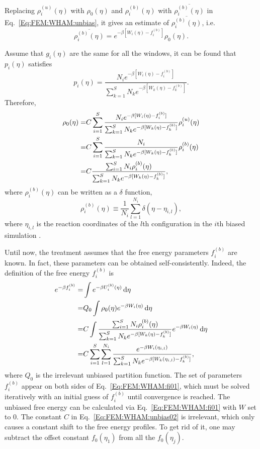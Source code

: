Replacing $\rho_i^{(u)}(\eta)$ with $\rho_0(\eta)$ and $\rho_i^{(b)}(\eta)$ with $\overline{\rho_i^{(b)}(\eta)}$ in Eq.~\ref{Eq:FEM:WHAM:unbias}, it gives an estimate of $\overline{\rho_i^{(b)}(\eta)}$, i.e.
\begin{equation}
	\overline{\rho_i^{(b)}(\eta)}=  e^{-\beta[W_{i}(\eta)-f_{i}^{(b)}]}\rho_0(\eta).
\end{equation}

Assume that $g_i(\eta)$ are the same for all the windows, it can be found that $p_i(\eta)$ satisfies
\begin{equation}
	p_i(\eta)=\frac{N_{i}e^{-\beta[W_{i}(\eta)-f_{i}^{(b)}]}}{\sum_{k=1}^{S}N_{k}e^{-\beta[W_{k}(\eta)-f_{k}^{(b)}]}}.
\end{equation}
Therefore,
\begin{align}
\rho_{0}(\eta) = & C\sum_{i=1}^{S}\frac{N_{i}e^{-\beta[W_{i}(\eta)-f_{i}^{(b)}]}}{\sum_{k=1}^{S}N_{k}e^{-\beta[W_{k}(\eta)-f_{k}^{(b)}]}}\rho_{i}^{(u)}(\eta) \notag\\
= & C\sum_{i=1}^{S}\frac{N_{i}}{\sum_{k=1}^{S}N_{k}e^{-\beta[W_{k}(\eta)-f_{k}^{(b)}]}}\rho_{i}^{(b)}(\eta) \notag\\
= & C\frac{\sum_{i=1}^{S}N_{i}\rho_{i}^{(b)}(\eta)}{\sum_{k=1}^{S}N_{k}e^{-\beta[W_{k}(\eta)-f_{k}^{(b)}]}},
\label{Eq:FEM:WHAM:unbias02}
\end{align} 
where $\rho_{i}^{(b)}(\eta)$ can be written as a $\delta$ function,
\begin{equation}
\rho_{i}^{(b)}(\eta) \equiv \frac{1}{N_{i}} \sum_{l=1}^{N_{i}} \delta {(\eta-\eta_{i,l})},
\label{Eq:FEM:WHAM:delta01}
\end{equation} 
where $\eta_{i,l}$ is the reaction coordinates of the $l$th configuration in the $i$th biased simulation .

Until now, the treatment assumes that the free energy parameters ${f_{i}^{(b)}}$ are known. In fact, these parameters can be obtained self-consistently. Indeed, the definition of the free energy $f_{i}^{(b)}$ is
\begin{align}
e^{-\beta f_{i}^{(b)}}=&\int e^{-\beta U_{i}^{(b)}(\eta) } \mathop{}\!\mathrm{d}\eta \notag\\
=&Q_0\int \rho_{0}(\eta) e^{-\beta W_{i}(\eta)} \mathop{}\!\mathrm{d}\eta \notag\\
=&C \int \frac{\sum_{i=1}^{S}N_{i}\rho_{i}^{(b)}(\eta)}{\sum_{k=1}^{S}N_{k}e^{-\beta[W_{k}(\eta)-f_{k}^{(b)}]}}e^{-\beta W_{i}(\eta)}  \mathop{}\!\mathrm{d}\eta \notag\\
=&C\sum_{i=1}^{S} \sum_{l=1}^{N_{i}} \frac{e^{-\beta W_{i}(\eta_{i,l})} }{\sum_{k=1}^{S}N_{k}e^{-\beta[W_{k}(\eta_{i,l})-f_{k}^{(b)}]}},
\label{Eq:FEM:WHAM:fi01}
\end{align}
where $Q_0$ is the irrelevant unbiased partition function.
The set of parameters ${f_{i}^{(b)}}$ appear on both sides of Eq.~\ref{Eq:FEM:WHAM:fi01}, which must be solved iteratively with an initial guess of ${f_{i}^{(b)}}$ until convergence is reached. The unbiased free energy can be calculated via Eq.~\ref{Eq:FEM:WHAM:fi01} with $W$ set to 0.
The constant $C$ in Eq.~\ref{Eq:FEM:WHAM:unbias02} is irrelevant, which only causes a constant shift to the free energy profiles. To get rid of it, one may subtract the offset constant $f_{0}(\eta_{1})$ from all the $f_{0}(\eta_{j})$.  

